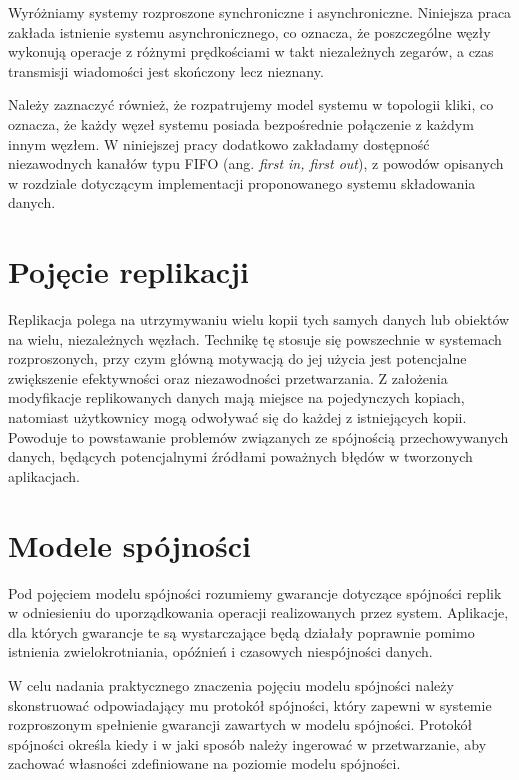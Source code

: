 Wyróżniamy systemy rozproszone synchroniczne i asynchroniczne. Niniejsza praca zakłada istnienie systemu asynchronicznego, co oznacza, że poszczególne węzły wykonują operacje z różnymi prędkościami w takt niezależnych zegarów, a czas transmisji wiadomości jest skończony lecz nieznany.

Należy zaznaczyć również, że rozpatrujemy model systemu w topologii kliki, co oznacza, że każdy węzeł systemu posiada bezpośrednie połączenie z każdym innym węzłem. W niniejszej pracy dodatkowo zakładamy dostępność niezawodnych kanałów typu FIFO (ang. \textit{first in, first out}), z powodów opisanych w rozdziale dotyczącym implementacji proponowanego systemu składowania danych.

\section{Pojęcie replikacji}


Replikacja polega na utrzymywaniu wielu kopii tych samych danych lub obiektów na wielu, niezależnych węzłach. Technikę tę stosuje się powszechnie w systemach rozproszonych, przy czym główną motywacją do jej użycia jest potencjalne zwiększenie efektywności oraz niezawodności przetwarzania. Z założenia modyfikacje replikowanych danych mają miejsce na pojedynczych kopiach, natomiast użytkownicy mogą odwoływać się do każdej z istniejących kopii. Powoduje to powstawanie problemów związanych ze spójnością przechowywanych danych, będących potencjalnymi źródłami poważnych błędów w tworzonych aplikacjach.

\section{Modele spójności}


Pod pojęciem modelu spójności rozumiemy gwarancje dotyczące spójności replik w odniesieniu do uporządkowania operacji realizowanych przez system. Aplikacje, dla których gwarancje te są wystarczające będą działały poprawnie pomimo istnienia zwielokrotniania, opóźnień i czasowych niespójności danych.

W celu nadania praktycznego znaczenia pojęciu modelu spójności należy skonstruować odpowiadający mu protokół spójności, który zapewni w systemie rozproszonym spełnienie gwarancji zawartych w modelu spójności. Protokół spójności określa kiedy i w jaki sposób należy ingerować w przetwarzanie, aby zachować własności zdefiniowane na poziomie modelu spójności.

